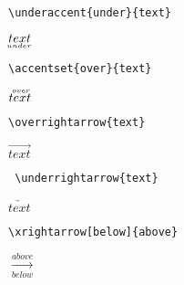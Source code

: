 \begin{center}
\begin{minipage}[l]{.4\textwidth}
\begin{verbatim}
\underaccent{under}{text}
\end{verbatim}
\end{minipage}
\begin{minipage}[r]{.2\textwidth}
$\underaccent{under}{text}$
\end{minipage}\vspace{.5cm}

\begin{minipage}[l]{.4\textwidth}
\begin{verbatim}
\accentset{over}{text}
\end{verbatim}
\end{minipage}
\begin{minipage}[r]{.2\textwidth}
$\accentset{over}{text}$
\end{minipage}\vspace{.5cm}

\begin{minipage}[l]{.4\textwidth}
\begin{verbatim}
\overrightarrow{text}
\end{verbatim}
\end{minipage}
\begin{minipage}[r]{.2\textwidth}
$\overrightarrow{text}$
\end{minipage}\vspace{.5cm}

\begin{minipage}[l]{.4\textwidth}
\begin{verbatim}
 \underrightarrow{text}
\end{verbatim}
\end{minipage}
\begin{minipage}[r]{.2\textwidth}
$\underrightarrow{text}$
\end{minipage}\vspace{.5cm}

\begin{minipage}[l]{.4\textwidth}
\begin{verbatim}
\xrightarrow[below]{above}
\end{verbatim}
\end{minipage}
\begin{minipage}[r]{.2\textwidth}
$\xrightarrow[below]{above}$
\end{minipage}\vspace{.5cm}


\end{center}
